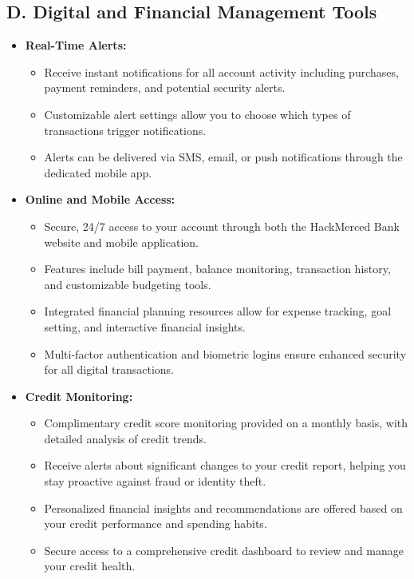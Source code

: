 \documentclass[12pt,a4paper]{article}
\begin{document}
\subsection*{D. Digital and Financial Management Tools}
\begin{itemize}
    \item \textbf{Real-Time Alerts:}
    \begin{itemize}
        \item Receive instant notifications for all account activity including purchases, payment reminders, and potential security alerts.
        \item Customizable alert settings allow you to choose which types of transactions trigger notifications.
        \item Alerts can be delivered via SMS, email, or push notifications through the dedicated mobile app.
    \end{itemize}
    
    \item \textbf{Online and Mobile Access:}
    \begin{itemize}
        \item Secure, 24/7 access to your account through both the HackMerced Bank website and mobile application.
        \item Features include bill payment, balance monitoring, transaction history, and customizable budgeting tools.
        \item Integrated financial planning resources allow for expense tracking, goal setting, and interactive financial insights.
        \item Multi-factor authentication and biometric logins ensure enhanced security for all digital transactions.
    \end{itemize}
    
    \item \textbf{Credit Monitoring:}
    \begin{itemize}
        \item Complimentary credit score monitoring provided on a monthly basis, with detailed analysis of credit trends.
        \item Receive alerts about significant changes to your credit report, helping you stay proactive against fraud or identity theft.
        \item Personalized financial insights and recommendations are offered based on your credit performance and spending habits.
        \item Secure access to a comprehensive credit dashboard to review and manage your credit health.
    \end{itemize}
\end{itemize}
\end{document}
